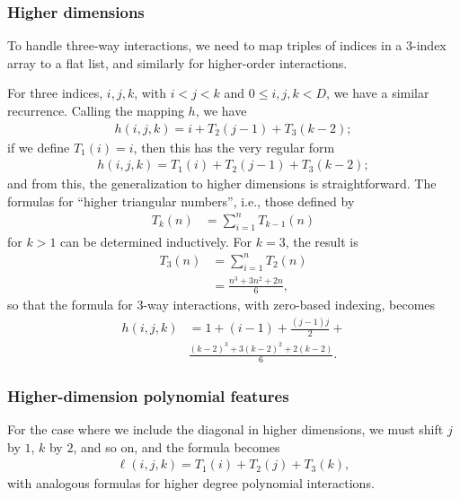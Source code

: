 \documentclass{article} %
\begin{document}
\subsubsection{Higher dimensions}
To handle three-way interactions, we need to map triples of indices in a 3-index array to a flat list, and similarly for higher-order interactions. 

For three indices, $i,j,k$, with $i < j < k$ and $0 \le i,j,k < D$, we have a similar recurrence. Calling the mapping $h$, we have 
\begin{align}
h(i,j,k) = i + T_2(j-1) + T_3(k-2);
\end{align}
if we define $T_1(i) = i$, then this has the very regular form
\begin{align}
h(i,j,k) =  T_1(i) + T_2(j-1) + T_3(k-2);
\end{align}
and from this, the generalization to higher dimensions is straightforward. The formulas for ``higher triangular numbers'', i.e., those defined by
\begin{align}
T_k(n) &= \sum_{i=1}^n T_{k-1}(n)
\end{align}
for $k > 1$ can be determined inductively. For $k = 3$, the result is 
\begin{align}
T_3(n) &= \sum_{i=1}^n T_{2}(n)\\
&= \frac{n^3 + 3n^2 + 2n}{6},
\end{align}
so that the formula for 3-way interactions, with zero-based indexing, becomes 
\begin{align}
h(i, j, k) &= 1 + (i-1) + \frac{(j-1)j}{2} + \\
& \frac{(k-2)^3 + 3(k-2)^2 + 2(k-2)}{6}. 
\end{align}
\subsubsection{Higher-dimension polynomial features}
For the case where we include the diagonal in higher dimensions, we must shift $j$ by $1$, $k$ by $2$, and so on, and the formula becomes
\begin{align}
\ell(i,j,k) =  T_1(i) + T_2(j) + T_3(k),
\end{align}
with analogous formulas for higher degree polynomial interactions. 
\end{document}
